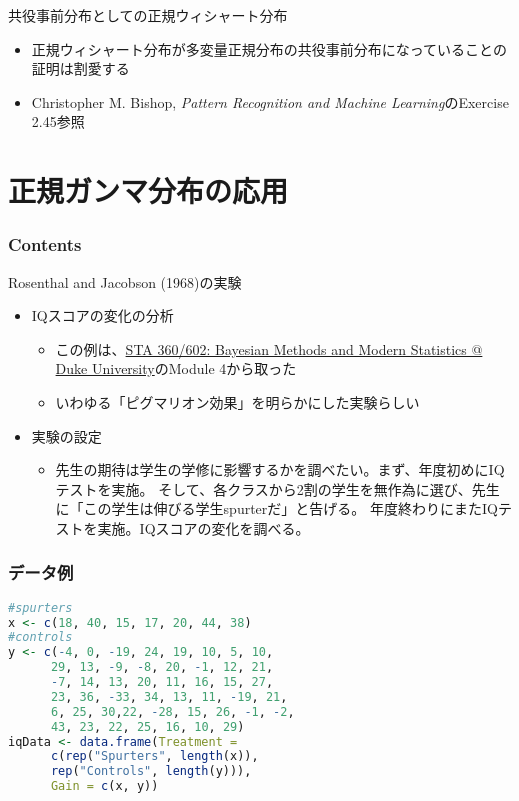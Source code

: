 \documentclass[aspectratio=169,unicode,dvipdfmx,14pt]{beamer}
\begin{document}
\begin{frame}{共役事前分布としての正規ウィシャート分布}
\begin{itemize}
\item 正規ウィシャート分布が多変量正規分布の共役事前分布になっていることの証明は割愛する
\item Christopher M. Bishop, \textit{Pattern Recognition and Machine Learning}のExercise 2.45参照
\end{itemize}
\end{frame}

\section{正規ガンマ分布の応用}

\begin{frame}\frametitle{Contents}
\Large \tableofcontents[currentsection]
\end{frame}

\begin{frame}{Rosenthal and Jacobson (1968)の実験}
\begin{itemize}
\item IQスコアの変化の分析
\begin{itemize}
\item この例は、\href{http://www2.stat.duke.edu/~rcs46/bayes17.html}{STA 360/602: Bayesian Methods and Modern Statistics @ Duke University}のModule 4から取った
\item いわゆる「ピグマリオン効果」を明らかにした実験らしい
\end{itemize}
\item 実験の設定
\begin{itemize}
\item 先生の期待は学生の学修に影響するかを調べたい。まず、年度初めにIQテストを実施。
そして、各クラスから2割の学生を無作為に選び、先生に「この学生は伸びる学生spurterだ」と告げる。
年度終わりにまたIQテストを実施。IQスコアの変化を調べる。
\end{itemize}
\end{itemize}
\end{frame}

\begin{frame}[fragile]
\FontMath
\frametitle{データ例}
\begin{lstlisting}[language=R]
#spurters
x <- c(18, 40, 15, 17, 20, 44, 38)
#controls
y <- c(-4, 0, -19, 24, 19, 10, 5, 10,
      29, 13, -9, -8, 20, -1, 12, 21,
      -7, 14, 13, 20, 11, 16, 15, 27,
      23, 36, -33, 34, 13, 11, -19, 21,
      6, 25, 30,22, -28, 15, 26, -1, -2,
      43, 23, 22, 25, 16, 10, 29)
iqData <- data.frame(Treatment =
      c(rep("Spurters", length(x)),
      rep("Controls", length(y))),
      Gain = c(x, y))
\end{lstlisting}
\end{frame}
\end{document}

